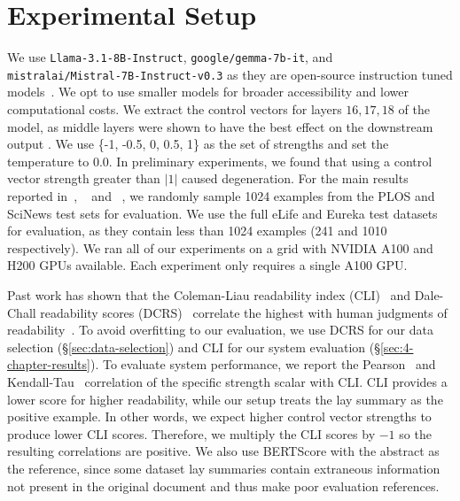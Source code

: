 \section{Experimental Setup}
We use  \texttt{Llama-3.1-8B-Instruct}, \texttt{google/gemma-7b-it}, and \\ \texttt{mistralai/Mistral-7B-Instruct-v0.3} as they are open-source instruction tuned models~\cite{grattafiori2024llama3,gemmateam2024gemmaopenmodelsbased}. We opt to use smaller models for broader accessibility and lower computational costs. We extract the control vectors for layers $16,17,18$ of the model, as middle layers were shown to have the best effect on the downstream output \cite{rimsky-etal-2024-steering}. We use \{-1, -0.5, 0,  0.5, 1\} as the set of strengths and set the temperature to 0.0. In preliminary experiments, we found that using a control vector strength greater than $|1|$ caused degeneration. For the main results reported in~, ~ and ~, we randomly sample 1024 examples from the PLOS and SciNews test sets for evaluation. We use the full eLife and Eureka test datasets for evaluation, as they contain less than 1024 examples (241 and 1010 respectively). We ran all of our experiments on a grid with NVIDIA A100 and H200 GPUs available. Each experiment only requires a single A100 GPU.

Past work has shown that the Coleman-Liau readability index (CLI)~\cite{Coleman1975ACR} and Dale-Chall readability scores (DCRS)~\cite{dale1948formula} correlate the highest with human judgments of readability~\cite{cachola-etal-2025-evaluating}. To avoid overfitting to our evaluation, we use DCRS for our data selection (\S\ref{sec:data-selection}) and CLI for our system evaluation (\S\ref{sec:4-chapter-results}). To evaluate system performance, we report the Pearson~\cite{PearsonVIINO} and Kendall-Tau~\cite{Kendall1938ANM} correlation of the specific strength scalar with CLI. CLI provides a lower score for higher readability, while our setup treats the lay summary as the positive example. In other words, we expect higher control vector strengths to produce lower CLI scores. Therefore, we multiply the CLI scores by $-1$ so the resulting correlations are positive. We also use BERTScore \cite{zhang2020bertscore} with the abstract as the reference, since some dataset lay summaries contain extraneous information not present in the original document and thus make poor evaluation references.

